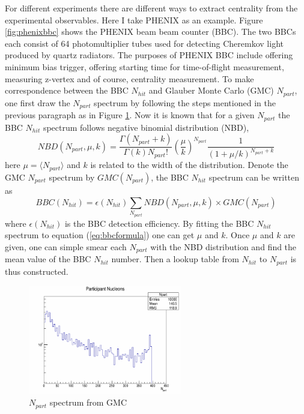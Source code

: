 \documentclass[11pt]{article} %
\begin{document}
For different experiments there are different ways to extract centrality from the experimental observables. Here I take PHENIX as an example. Figure \ref{fig:phenixbbc} shows the PHENIX beam beam counter (BBC). The two BBCs each consist of 64 photomultiplier tubes used for detecting Cheremkov light produced by quartz radiators. The purposes of PHENIX BBC include offering minimum bias trigger, offering starting time for time-of-flight measurement, measuring z-vertex and of course, centrality measurement. To make correspondence between the BBC $N_{hit}$ and Glauber Monte Carlo (GMC) $N_{part}$, one first draw the $N_{part}$ spectrum by following the steps mentioned in the previous paragraph as in Figure \ref{fig:npartspec}. Now it is known that for a given $N_{part}$ the BBC $N_{hit}$ spectrum follows negative binomial distribution (NBD),
\begin{equation}
NBD(N_{part},\mu,k)=\frac{\Gamma(N_{part}+k)}{\Gamma(k)N_{part}!}\left( \frac{\mu}{k} \right)^{N_{part}}\frac{1}{(1+\mu/k)^{N_{part}+k}}
\end{equation}
here $\mu=\langle N_{part}\rangle$ and $k$ is related to the width of the distribution. Denote the GMC $N_{part}$ spectrum by $GMC(N_{part})$, the BBC $N_{hit}$ spectrum can be written as
\begin{equation}\label{eq:bbcformula}
BBC(N_{hit})=\epsilon(N_{hit})\sum\limits_{N_{part}}NBD(N_{part},\mu,k)\times GMC(N_{part})
\end{equation}
where $\epsilon(N_{hit})$ is the BBC detection efficiency. By fitting the BBC $N_{hit}$ spectrum to equation (\ref{eq:bbcformula}) one can get $\mu$ and $k$. Once $\mu$ and $k$ are given, one can simple smear each $N_{part}$ with the NBD distribution and find the mean value of the BBC $N_{hit}$ number. Then a lookup table from $N_{hit}$ to $N_{part}$ is thus constructed.

\begin{figure}
    \centering
    \includegraphics[width=0.6\textwidth]{plots/Npart_spec.pdf}
    \caption{$N_{part}$ spectrum from GMC}
    \label{fig:npartspec}
\end{figure}
\end{document}
